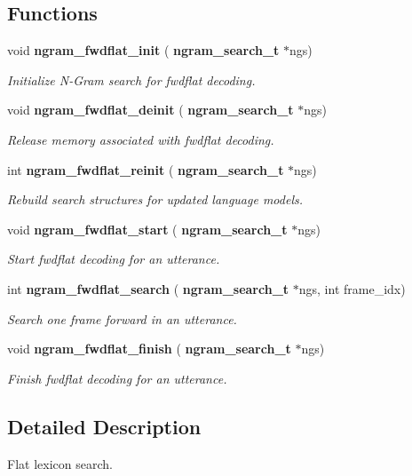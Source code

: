 \subsection*{Functions}
\begin{DoxyCompactItemize}
\item 
\mbox{\label{ngram__search__fwdflat_8c_ad4b8ebd904c77f8a28f59cd5ca2c8307}} 
void \textbf{ ngram\+\_\+fwdflat\+\_\+init} (\textbf{ ngram\+\_\+search\+\_\+t} $\ast$ngs)
\begin{DoxyCompactList}\small\item\em Initialize N-\/\+Gram search for fwdflat decoding. \end{DoxyCompactList}\item 
\mbox{\label{ngram__search__fwdflat_8c_a8faf467f90162a7273b23304fc6e8586}} 
void \textbf{ ngram\+\_\+fwdflat\+\_\+deinit} (\textbf{ ngram\+\_\+search\+\_\+t} $\ast$ngs)
\begin{DoxyCompactList}\small\item\em Release memory associated with fwdflat decoding. \end{DoxyCompactList}\item 
\mbox{\label{ngram__search__fwdflat_8c_aa4879c06ddbc455a6f355084a9c574b4}} 
int \textbf{ ngram\+\_\+fwdflat\+\_\+reinit} (\textbf{ ngram\+\_\+search\+\_\+t} $\ast$ngs)
\begin{DoxyCompactList}\small\item\em Rebuild search structures for updated language models. \end{DoxyCompactList}\item 
\mbox{\label{ngram__search__fwdflat_8c_a763c2c7aaa5d7f9c5107af73552a2149}} 
void \textbf{ ngram\+\_\+fwdflat\+\_\+start} (\textbf{ ngram\+\_\+search\+\_\+t} $\ast$ngs)
\begin{DoxyCompactList}\small\item\em Start fwdflat decoding for an utterance. \end{DoxyCompactList}\item 
\mbox{\label{ngram__search__fwdflat_8c_ae77ef21ae92dbcc4b14f40469fbd4307}} 
int \textbf{ ngram\+\_\+fwdflat\+\_\+search} (\textbf{ ngram\+\_\+search\+\_\+t} $\ast$ngs, int frame\+\_\+idx)
\begin{DoxyCompactList}\small\item\em Search one frame forward in an utterance. \end{DoxyCompactList}\item 
\mbox{\label{ngram__search__fwdflat_8c_ac855cf540ac4acdfa320629720ded6fe}} 
void \textbf{ ngram\+\_\+fwdflat\+\_\+finish} (\textbf{ ngram\+\_\+search\+\_\+t} $\ast$ngs)
\begin{DoxyCompactList}\small\item\em Finish fwdflat decoding for an utterance. \end{DoxyCompactList}\end{DoxyCompactItemize}


\subsection{Detailed Description}
Flat lexicon search. 

